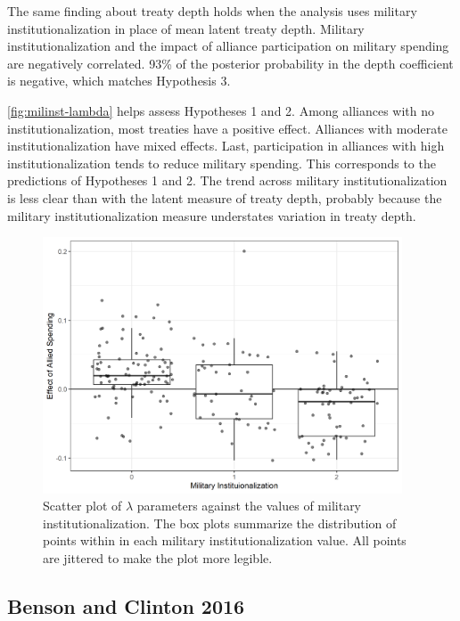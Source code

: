 \documentclass[12pt]{article}
\begin{document}
The same finding about treaty depth holds when the analysis uses military institutionalization in place of mean latent treaty depth. 
Military institutionalization and the impact of alliance participation on military spending are negatively correlated. 
93\% of the posterior probability in the depth coefficient is negative, which matches Hypothesis 3. 


\autoref{fig:milinst-lambda} helps assess Hypotheses 1 and 2. 
Among alliances with no institutionalization, most treaties have a positive effect. 
Alliances with moderate institutionalization have mixed effects. 
Last, participation in alliances with high institutionalization tends to reduce military spending. 
This corresponds to the predictions of Hypotheses 1 and 2. 
The trend across military institutionalization is less clear than with the latent measure of treaty depth, probably because the military institutionalization measure understates variation in treaty depth.  


\begin{figure}[htbp]
	\centering
		\includegraphics[width=0.95\textwidth]{milinst-lambda.png}
	\caption{Scatter plot of $\lambda$ parameters against the values of military institutionalization. The box plots summarize the distribution of points within in each military institutionalization value. All points are jittered to make the plot more legible.}
	\label{fig:milinst-lambda}
\end{figure}



\subsection{Benson and Clinton 2016}
\end{document}
